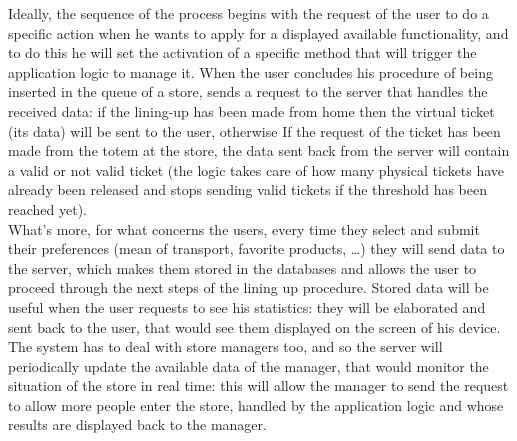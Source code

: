 \documentclass[]{article}
\begin{document}
\begin{paragraph}
					
					Ideally, the sequence of the process begins with the request of the user to do a specific action when he wants to apply for a displayed available functionality, and to do this he will set the activation of a specific method that will trigger the application logic to manage it.
When the user concludes his procedure of being inserted in the queue of a store, sends a request to the server that handles the received data: if the lining-up has been made from home then the virtual ticket (its data) will be sent to the user, otherwise If the request of the ticket has been made from the totem at the store, the data sent back from the server will contain a valid or not valid ticket (the logic takes care of how many physical tickets have already been released and stops  sending valid tickets if the threshold has been reached yet).\\
					\newline
What’s more, for what concerns the users, every time they select and submit their preferences (mean of transport, favorite products, …) they will send data to the server, which makes them stored in the databases and allows the user to proceed through the next steps of the lining up procedure. Stored data will be useful when the user requests to see his statistics: they will be elaborated and sent back to the user, that would see them displayed on the screen of his device.\\
					\newline
The system has to deal with store managers too, and so the server will periodically update the available data of the manager, that would monitor the situation of the store in real time: this will allow the manager to send the request to allow more people enter the store, handled by the application logic and whose results are displayed back to the manager. \newline


\end{paragraph}
\end{document}
